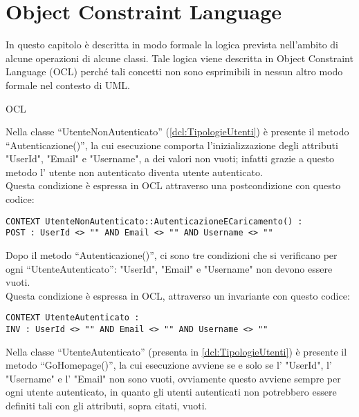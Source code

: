 \section{Object Constraint Language}
\label{secD3:ObjectConstraintLanguage}

In questo capitolo è descritta in modo formale la logica prevista nell'ambito di alcune operazioni di alcune classi. Tale logica viene descritta in Object Constraint Language (OCL) perché tali concetti non sono esprimibili in nessun altro modo formale nel contesto di UML.


\begin{listaPersonale}{OCL}
    \begin{center}
        
    \end{center}
    Nella classe “UtenteNonAutenticato” (\ref{dcl:TipologieUtenti}) è presente il metodo “Autenticazione()”, la cui esecuzione comporta l'inizializzazione degli attributi "UserId", "Email" e "Username", a dei valori non vuoti; infatti grazie a questo metodo l' utente non autenticato diventa utente autenticato. \\
    Questa condizione è espressa in OCL attraverso una postcondizione con questo codice:
    \begin{lstlisting}
CONTEXT UtenteNonAutenticato::AutenticazioneECaricamento() : 
POST : UserId <> "" AND Email <> "" AND Username <> ""
    \end{lstlisting}
    Dopo il metodo “Autenticazione()”, ci sono tre condizioni che si verificano per ogni “UtenteAutenticato”: "UserId", "Email" e "Username" non devono essere vuoti. \\ Questa condizione è espressa in OCL, attraverso un invariante con questo codice:
    \begin{lstlisting}
CONTEXT UtenteAutenticato : 
INV : UserId <> "" AND Email <> "" AND Username <> ""
    \end{lstlisting}
    Nella classe “UtenteAutenticato” (presenta in \ref{dcl:TipologieUtenti}) è presente il metodo “GoHomepage()”, la cui esecuzione avviene se e solo se l' "UserId", l' "Username" e l' "Email" non sono vuoti, ovviamente questo avviene sempre per ogni utente autenticato, in quanto gli utenti autenticati non potrebbero essere definiti tali con gli attributi, sopra citati, vuoti. \\

\end{listaPersonale}
